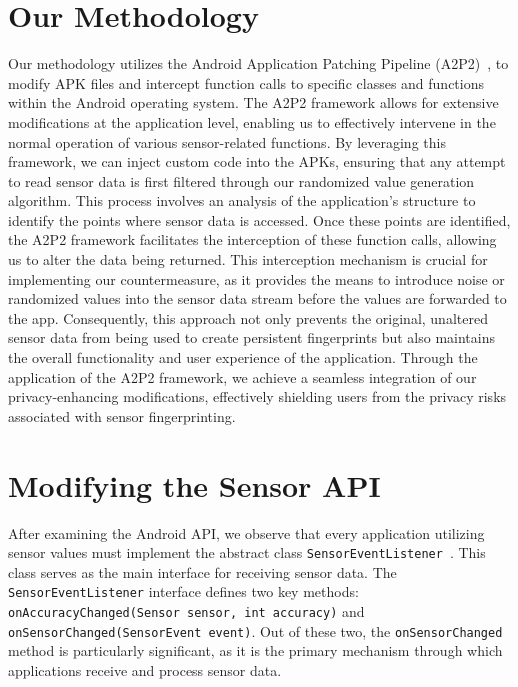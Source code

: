 \documentclass[11pt,
  oneside,openany,    %
]{scrreprt}
\begin{document}
\section{Our Methodology}
\label{sec:our_methodology}
Our methodology utilizes the Android Application Patching Pipeline (A2P2)~\cite{DBLP:conf/IEEEares/Draschbacher23}, to modify APK files and intercept function calls to specific classes and functions within the Android operating system.
The A2P2 framework allows for extensive modifications at the application level, enabling us to effectively intervene in the normal operation of various sensor-related functions.
By leveraging this framework, we can inject custom code into the APKs, ensuring that any attempt to read sensor data is first filtered through our randomized value generation algorithm.
This process involves an analysis of the application's structure to identify the points where sensor data is accessed.
Once these points are identified, the A2P2 framework facilitates the interception of these function calls, allowing us to alter the data being returned.
This interception mechanism is crucial for implementing our countermeasure, as it provides the means to introduce noise or randomized values into the sensor data stream before the values are forwarded to the app.
Consequently, this approach not only prevents the original, unaltered sensor data from being used to create persistent fingerprints but also maintains the overall functionality and user experience of the application.
Through the application of the A2P2 framework, we achieve a seamless integration of our privacy-enhancing modifications, effectively shielding users from the privacy risks associated with sensor fingerprinting.

\section{Modifying the Sensor API}
\label{sec:function}
After examining the Android API, we observe that every application utilizing sensor values must implement the abstract class \verb|SensorEventListener|~\cite{android_sensoreventlistener}.
This class serves as the main interface for receiving sensor data.
The \verb|SensorEventListener| interface defines two key methods: \verb|onAccuracyChanged(Sensor sensor, int accuracy)| and \verb|onSensorChanged(SensorEvent event)|.
Out of these two, the \verb|onSensorChanged| method is particularly significant, as it is the primary mechanism through which applications receive and process sensor data.
\end{document}
